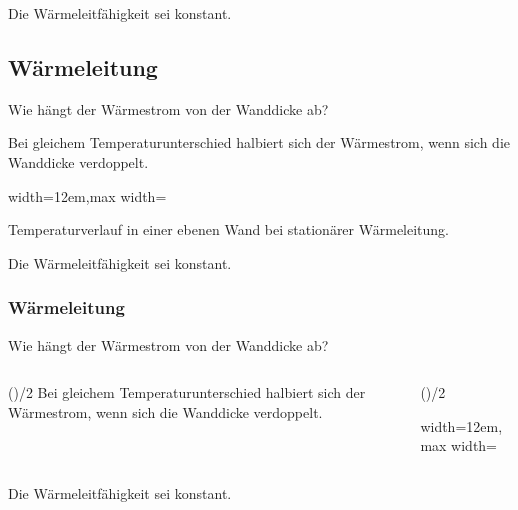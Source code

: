 Die Wärmeleitfähigkeit sei konstant.

\subsection{Wärmeleitung}

Wie hängt der Wärmestrom von der Wanddicke ab?

\par
Bei gleichem Temperaturunterschied halbiert sich der Wärmestrom, wenn sich die Wanddicke verdoppelt.
\par

\par
\par\begingroup\centering\noindent\begin{adjustbox}{width=12em,max width=\linewidth}


\end{adjustbox}\par
Temperaturverlauf in einer ebenen Wand bei stationärer Wärmeleitung.
\par\endgroup
\par

Die Wärmeleitfähigkeit sei konstant.

\begin{frame}[t]
\frametitle{Wärmeleitung}

Wie hängt der Wärmestrom von der Wanddicke ab?

\begin{columns}[T,onlytextwidth]
\begin{column}{\dimexpr(\columnsep)/2\relax}
Bei gleichem Temperaturunterschied halbiert sich der Wärmestrom, wenn sich die Wanddicke verdoppelt.
\end{column}

\begin{column}{\dimexpr(\columnsep)/2\relax}
\par\begingroup\centering\noindent\begin{adjustbox}{width=12em,max width=\linewidth}


\end{adjustbox}\par
\par\endgroup
\end{column}
\end{columns}

Die Wärmeleitfähigkeit sei konstant.

\end{frame}

